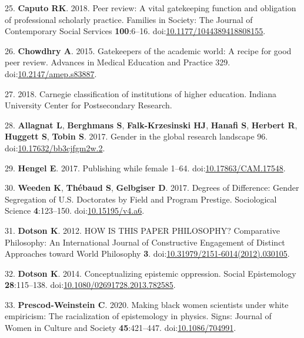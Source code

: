 \documentclass[11pt,]{article}
\begin{document}
\leavevmode\hypertarget{ref-Caputo2018}{}%
25. \textbf{Caputo RK}. 2018. Peer review: A vital gatekeeping function
and obligation of professional scholarly practice. Families in Society:
The Journal of Contemporary Social Services \textbf{100}:6--16.
doi:\href{https://doi.org/10.1177/1044389418808155}{10.1177/1044389418808155}.

\leavevmode\hypertarget{ref-Chowdhry2015}{}%
26. \textbf{Chowdhry A}. 2015. Gatekeepers of the academic world: A
recipe for good peer review. Advances in Medical Education and Practice
329.
doi:\href{https://doi.org/10.2147/amep.s83887}{10.2147/amep.s83887}.

\leavevmode\hypertarget{ref-Carnegie2018}{}%
27. 2018. Carnegie classification of institutions of higher education.
Indiana University Center for Postsecondary Research.

\leavevmode\hypertarget{ref-allagnat_gender_2017}{}%
28. \textbf{Allagnat L}, \textbf{Berghmans S}, \textbf{Falk-Krzesinski
HJ}, \textbf{Hanafi S}, \textbf{Herbert R}, \textbf{Huggett S},
\textbf{Tobin S}. 2017. Gender in the global research landscape 96.
doi:\href{https://doi.org/10.17632/bb3cjfgm2w.2}{10.17632/bb3cjfgm2w.2}.

\leavevmode\hypertarget{ref-erin_hengel_publishing_2017}{}%
29. \textbf{Hengel E}. 2017. Publishing while female 1--64.
doi:\href{https://doi.org/10.17863/CAM.17548}{10.17863/CAM.17548}.

\leavevmode\hypertarget{ref-weeden_degrees_2017}{}%
30. \textbf{Weeden K}, \textbf{Thébaud S}, \textbf{Gelbgiser D}. 2017.
Degrees of Difference: Gender Segregation of U.S. Doctorates by Field
and Program Prestige. Sociological Science \textbf{4}:123--150.
doi:\href{https://doi.org/10.15195/v4.a6}{10.15195/v4.a6}.

\leavevmode\hypertarget{ref-Dotson2012}{}%
31. \textbf{Dotson K}. 2012. HOW IS THIS PAPER PHILOSOPHY? Comparative
Philosophy: An International Journal of Constructive Engagement of
Distinct Approaches toward World Philosophy \textbf{3}.
doi:\href{https://doi.org/10.31979/2151-6014(2012).030105}{10.31979/2151-6014(2012).030105}.

\leavevmode\hypertarget{ref-Dotson2014}{}%
32. \textbf{Dotson K}. 2014. Conceptualizing epistemic oppression.
Social Epistemology \textbf{28}:115--138.
doi:\href{https://doi.org/10.1080/02691728.2013.782585}{10.1080/02691728.2013.782585}.

\leavevmode\hypertarget{ref-PrescodWeinstein2020}{}%
33. \textbf{Prescod-Weinstein C}. 2020. Making black women scientists
under white empiricism: The racialization of epistemology in physics.
Signs: Journal of Women in Culture and Society \textbf{45}:421--447.
doi:\href{https://doi.org/10.1086/704991}{10.1086/704991}.
\end{document}
